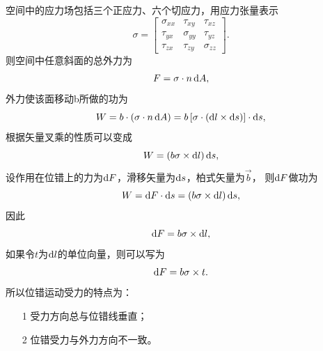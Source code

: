                     空间中的应力场包括三个正应力、六个切应力，用应力张量表示
                    \begin{equation}
                        \sigma=\begin{bmatrix}
                            \sigma_{xx}&\tau_{xy}&\tau_{xz}\\
                            \tau_{yx}&\sigma_{yy}&\tau_{yz}\\
                            \tau_{zx}&\tau_{zy}&\sigma_{zz}
                        \end{bmatrix}.
                    \end{equation}
                    则空间中任意斜面的总外力为
                    \begin{equation}
                        F=\sigma\cdot n\mathop{}\!\mathrm{d} A,
                    \end{equation}
                    外力使该面移动b所做的功为
                    \begin{equation}
                        W=b\cdot\left( \sigma\cdot n\mathop{}\!\mathrm{d} A \right)=b\left[ \sigma\cdot(\mathop{}\!\mathrm{d} l\times\mathop{}\!\mathrm{d} s) \right]\cdot\mathop{}\!\mathrm{d} s,
                    \end{equation}
                    根据矢量叉乘的性质可以变成
                    \begin{equation}
                        W=\left( b\sigma\times\mathop{}\!\mathrm{d} l \right)\mathop{}\!\mathrm{d} s,
                    \end{equation}
                    设作用在位错上的力为$\mathop{}\!\mathrm{d} F$，滑移矢量为$\mathop{}\!\mathrm{d} s$，柏式矢量为$\vec{b}$，
                    则$\mathop{}\!\mathrm{d} F$做功为
                    \begin{equation}
                        W=\mathop{}\!\mathrm{d} F\cdot\mathop{}\!\mathrm{d} s=\left( b\sigma\times\mathop{}\!\mathrm{d} l \right)\mathop{}\!\mathrm{d} s,
                    \end{equation}
                    因此
                    \begin{equation}
                        \mathop{}\!\mathrm{d} F=b\sigma\times\mathop{}\!\mathrm{d} l,
                    \end{equation}
                    如果令$t$为$\mathop{}\!\mathrm{d} l$的单位向量，则可以写为
                    \begin{equation}
                        \mathop{}\!\mathrm{d} F=b\sigma\times t.
                    \end{equation}
                    所以位错运动受力的特点为：
                    \begin{itemize}
                        \item[1] 受力方向总与位错线垂直；
                        \item[2] 位错受力与外力方向不一致。
                    \end{itemize}
